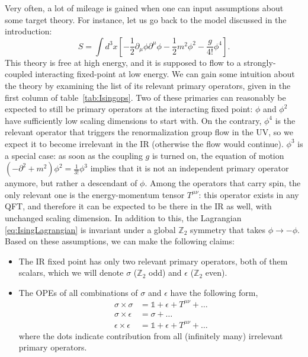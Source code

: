 \documentclass[a4paper,12pt]{article}
\numberwithin{equation}{section}
\begin{document}
Very often, a lot of mileage is gained when one can input assumptions about some target theory. For instance, let us go back to the model discussed in the introduction:
\begin{equation}
	S = \int d^3x \left[
	-\frac{1}{2} \partial_\mu \phi \partial^\mu \phi
	- \frac{1}{2} m^2 \phi^2 - \frac{g}{4!} \phi^4 \right].
	\label{eq:IsingLagrangian}
\end{equation}
This theory is free at high energy, and it is supposed to flow to a strongly-coupled interacting fixed-point at low energy.
We can gain some intuition about the theory by examining the list of its relevant primary operators, given in the first column of table~\ref{tab:Isingops}. Two of these primaries can reasonably be expected to still be primary operators at the interacting fixed point: $\phi$ and $\phi^2$ have sufficiently low scaling dimensions to start with. On the contrary, $\phi^4$ is the relevant operator that triggers the renormalization group flow in the UV, so we expect it to become irrelevant in the IR (otherwise the flow would continue). $\phi^3$ is a special case: as soon as the coupling $g$ is turned on, the equation of motion $(-\partial^2 + m^2) \phi^2 = \frac{1}{3!} \phi^3$ implies that it is not an independent primary operator anymore, but rather a descendant of $\phi$.
Among the operators that carry spin, the only relevant one is the energy-momentum tensor $T^{\mu\nu}$: this operator exists in any QFT, and therefore it can be expected to be there in the IR as well, with unchanged scaling dimension.
In addition to this, the Lagrangian \eqref{eq:IsingLagrangian} is invariant under a global $\mathbb{Z}_2$ symmetry that takes $\phi \to -\phi$. Based on these assumptions, we can make the following claims:
\begin{itemize}

\item
The IR fixed point has only two relevant primary operators, both of them scalars, which we will denote $\sigma$ ($\mathbb{Z}_2$ odd) and $\epsilon$ ($\mathbb{Z}_2$ even).

\item
The OPEs of all combinations of $\sigma$ and $\epsilon$ have the following form,
\begin{align}
	\sigma \times \sigma &= \mathds{1} + \epsilon + T^{\mu\nu} + \ldots
	\nonumber \\
	\sigma \times \epsilon &= \sigma + \ldots
	\label{eq:IsingOPE}
	\\
	\epsilon \times \epsilon &=
	\mathds{1} + \epsilon + T^{\mu\nu} + \ldots
	\nonumber
\end{align}
where the dots indicate contribution from all (infinitely many) irrelevant primary operators.

\end{itemize}
\end{document}
